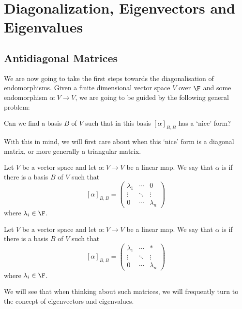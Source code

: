 \documentclass[a4paper]{scrartcl}
\begin{document}
\section{Diagonalization, Eigenvectors and Eigenvalues}


\subsection{Antidiagonal Matrices}

We are now going to take the first steps towards the diagonalisation of endomorphisms. 
Given a finite dimensional vector space $V$ over $\F$ and some endomorphism $\alpha: V \rightarrow V$, we are going to be guided by the following general problem:
\begin{center}\color{blue}
    Can we find a basis $B$ of $V$ such that in this basis $[\alpha]_{B, B}$ has a `nice' form?
\end{center}
With this in mind, we will first care about when this `nice' form is a diagonal matrix, or more generally a triangular matrix.


\begin{definition}[Diagonalizable]
    Let $V$ be a vector space and let $\alpha: V \rightarrow V$ be a linear map. We say that $\alpha$ is  if there is a basis $B$ of $V$ such that
    $$
    [\alpha]_{B, B} = \begin{pmatrix}
        \lambda_1 & \cdots & 0 \\
        \vdots & \ddots & \vdots \\
        0 & \cdots & \lambda_n
    \end{pmatrix}
    $$
    where $\lambda_i \in \F$.
\end{definition}

\begin{definition}[Triangulable]    
    Let $V$ be a vector space and let $\alpha: V \rightarrow V$ be a linear map. We say that $\alpha$ is  if there is a basis $B$ of $V$ such that
    $$
    [\alpha]_{B, B} = \begin{pmatrix}
        \lambda_1 & \cdots & * \\
        \vdots & \ddots & \vdots \\
        0 & \cdots & \lambda_n
    \end{pmatrix}
    $$
    where $\lambda_i \in \F$. 
\end{definition}


We will see that when thinking about such matrices, we will frequently turn to the concept of eigenvectors and eigenvalues.
\end{document}
